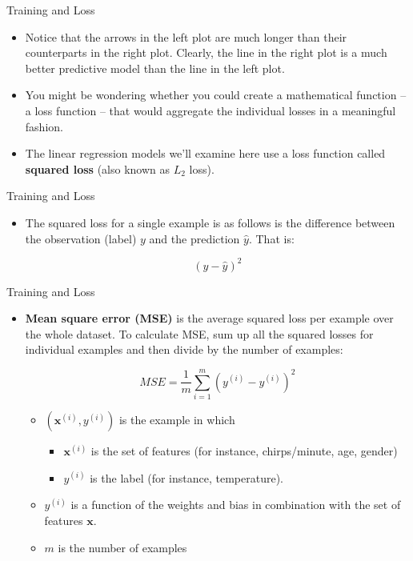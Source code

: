 \documentclass{beamer}
\begin{document}
\begin{frame}{Training and Loss}
\begin{itemize}
    \item Notice that the arrows in the left plot are much longer than their counterparts in the right plot. Clearly, the line in the right plot is a much better predictive model than the line in the left plot.
    
    \item You might be wondering whether you could create a mathematical function -- a loss function -- that would aggregate the individual losses in a meaningful fashion.
    
    \item The linear regression models we'll examine here use a loss function called {\bf squared loss} (also known as $L_2$ loss). 
\end{itemize}
\end{frame}

\begin{frame}{Training and Loss}
\begin{itemize}
    \item The squared loss for a single example is as follows is the difference between the observation (label) $y$ and the prediction $\hat{y}$. That is:
    
    $$ (y - \hat{y})^2 $$
    
\end{itemize}
\end{frame}

\begin{frame}{Training and Loss}
\begin{itemize}
    \item {\bf Mean square error (MSE)} is the average squared loss per example over the whole dataset. To calculate MSE, sum up all the squared losses for individual examples and then divide by the number of examples:
    
    $$ MSE = \frac{1}{m} \sum_{i=1}^m (y^{(i)} - y^{(i)})^2 $$

    \begin{itemize}
        \item $(\boldsymbol{x}^{(i)},y^{(i)})$ is the example in which
        \begin{itemize}
            \item $\boldsymbol{x}^{(i)}$ is the set of features (for instance, chirps/minute, age, gender) 
            \item $y^{(i)}$ is the label (for instance, temperature).
        \end{itemize}
        \item $y^{(i)}$ is a function of the weights and bias in combination with the set of features $\boldsymbol{x}$.
        \item $m$ is the number of examples
    \end{itemize}
\end{itemize}
\end{frame}
\end{document}
